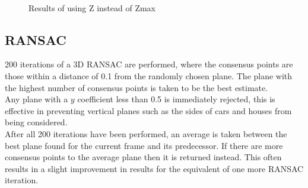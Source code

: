 \documentclass[10pt]{article}
\begin{document}
    \begin{figure}[!h]
        \centering
        \hfill
        \\
        \hfill
        \caption{Results of using Z instead of Zmax}
    \end{figure}

\subsection *{RANSAC}
    200 iterations of a 3D RANSAC are performed, where the consensus points are those within a distance of 0.1 from the randomly chosen plane. The plane with the highest number of consensus points is taken to be the best estimate. \\
    Any plane with a $y$ coefficient less than 0.5 is immediately rejected, this is effective in preventing vertical planes such as the sides of cars and houses from being considered. \\
    After all 200 iterations have been performed, an average is taken between the best plane found for the current frame and its predecessor. If there are more consensus points to the average plane then it is returned instead. This often results in a slight improvement in results for the equivalent of one more RANSAC iteration.
\end{document}
